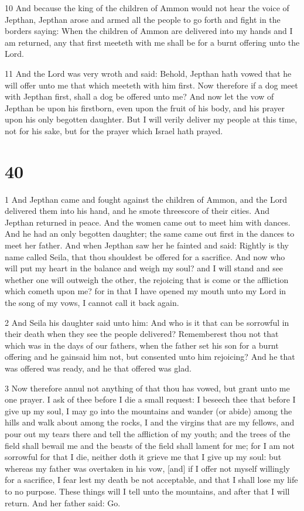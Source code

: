 \par 10 And because the king of the children of Ammon would not hear the voice of Jepthan, Jepthan arose and armed all the people to go forth and fight in the borders saying: When the children of Ammon are delivered into my hands and I am returned, any that first meeteth with me shall be for a burnt offering unto the Lord.

\par 11 And the Lord was very wroth and said: Behold, Jepthan hath vowed that he will offer unto me that which meeteth with him first. Now therefore if a dog meet with Jepthan first, shall a dog be offered unto me? And now let the vow of Jepthan be upon his firstborn, even upon the fruit of his body, and his prayer upon his only begotten daughter. But I will verily deliver my people at this time, not for his sake, but for the prayer which Israel hath prayed.

\chapter{40}

\par 1 And Jepthan came and fought against the children of Ammon, and the Lord delivered them into his hand, and he smote threescore of their cities. And Jepthan returned in peace. And the women came out to meet him with dances. And he had an only begotten daughter; the same came out first in the dances to meet her father. And when Jepthan saw her he fainted and said: Rightly is thy name called Seila, that thou shouldest be offered for a sacrifice. And now who will put my heart in the balance and weigh my soul? and I will stand and see whether one will outweigh the other, the rejoicing that is come or the affliction which cometh upon me? for in that I have opened my mouth unto my Lord in the song of my vows, I cannot call it back again. 

\par 2 And Seila his daughter said unto him: And who is it that can be sorrowful in their death when they see the people delivered? Rememberest thou not that which was in the days of our fathers, when the father set his son for a burnt offering and he gainsaid him not, but consented unto him rejoicing? And he that was offered was ready, and he that offered was glad. 

\par 3 Now therefore annul not anything of that thou has vowed, but grant unto me one prayer. I ask of thee before I die a small request: I beseech thee that before I give up my soul, I may go into the mountains and wander (or abide) among the hills and walk about among the rocks, I and the virgins that are my fellows, and pour out my tears there and tell the affliction of my youth; and the trees of the field shall bewail me and the beasts of the field shall lament for me; for I am not sorrowful for that I die, neither doth it grieve me that I give up my soul: but whereas my father was overtaken in his vow, [and] if I offer not myself willingly for a sacrifice, I fear lest my death be not acceptable, and that I shall lose my life to no purpose. These things will I tell unto the mountains, and after that I will return. And her father said: Go. 

